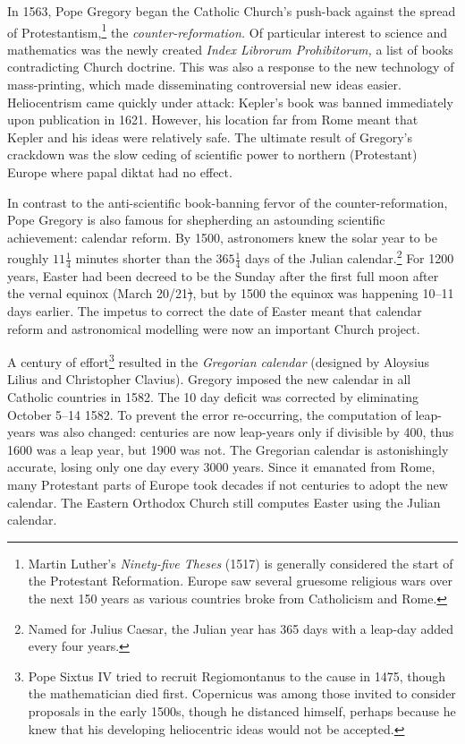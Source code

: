 \goodbreak



In 1563, Pope Gregory began the Catholic Church's push-back against the spread of Protestantism,\footnote{Martin Luther's \emph{Ninety-five Theses} (1517) is generally considered the start of the Protestant Reformation. Europe saw several gruesome religious wars over the next 150 years as various countries broke from Catholicism and Rome.} the \emph{counter-reformation.} Of particular interest to science and mathematics was the newly created \emph{Index Librorum Prohibitorum,} a list of books contradicting Church doctrine. This was also a response to the new technology of mass-printing, which made disseminating controversial new ideas easier. Heliocentrism came quickly under attack: Kepler's book was banned immediately upon publication in 1621. However, his location far from Rome meant that Kepler and his ideas were relatively safe. The ultimate result of Gregory's crackdown was the slow ceding of scientific power to northern (Protestant) Europe where papal diktat had no effect. \smallbreak

In contrast to the anti-scientific book-banning fervor of the counter-reformation, Pope Gregory is also famous for shepherding an astounding scientific achievement: calendar reform. By 1500, astronomers knew the solar year to be roughly $11\frac 14$ minutes shorter than the $365\frac 14$ days of the Julian calendar.\footnote{Named for Julius Caesar, the Julian year has 365 days with a leap-day added every four years.} For 1200 years, Easter had been decreed to be the Sunday after the first full moon after the vernal equinox (March 20\th/21\st), but by 1500 the equinox was happening 10--11 days earlier. The impetus to correct the date of Easter meant that calendar reform and astronomical modelling were now an important Church project.\smallbreak

A century of effort\footnote{Pope Sixtus IV tried to recruit Regiomontanus to the cause in 1475, though the mathematician died first. Copernicus was among those invited to consider proposals in the early 1500s, though he distanced himself, perhaps because he knew that his developing heliocentric ideas would not be accepted.} resulted in the \emph{Gregorian calendar} (designed by Aloysius Lilius and Christopher Clavius). Gregory imposed the new calendar in all Catholic countries in 1582. The 10 day deficit was corrected by eliminating October 5\th--14\th{} 1582. To prevent the error re-occurring, the computation of leap-years was also changed: centuries are now leap-years only if divisible by 400, thus 1600 was a leap year, but 1900 was not. The Gregorian calendar is astonishingly accurate, losing only one day every 3000 years. Since it emanated from Rome, many Protestant parts of Europe took decades if not centuries to adopt the new calendar. The Eastern Orthodox Church still computes Easter using the Julian calendar.%


